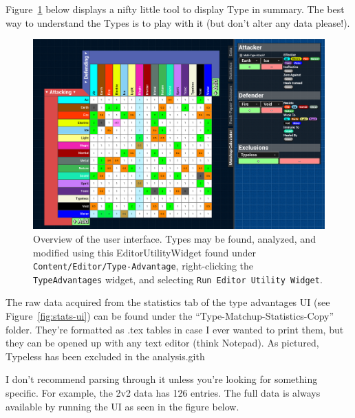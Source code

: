 \newpage


Figure~\ref{fig:ui} below displays a nifty little tool to display Type in summary. The best way to understand the Types is to play with it (but don't alter any data please!).

\begin{figure}[H]
	\centering
	\includegraphics[width=\textwidth]{../Types-Documentation/ui-overview}
	\caption{Overview of the user interface. Types may be found, analyzed, and modified using this EditorUtilityWidget found under \texttt{Content/Editor/Type-Advantage}, right-clicking the \texttt{TypeAdvantages} widget, and selecting \texttt{Run Editor Utility Widget}.}
	\label{fig:ui}
\end{figure}

The raw data acquired from the statistics tab of the type advantages UI (see Figure~\ref{fig:stats-ui}) can be found under the ``Type-Matchup-Statistics-Copy'' folder. They're formatted as .tex tables in case I ever wanted to print them, but they can be opened up with any text editor (think Notepad). As pictured, Typeless has been excluded in the analysis.gith

I don't recommend parsing through it unless you're looking for something specific. For example, the 2v2 data has 126 entries. The full data is always available by running the UI as seen in the figure below.

